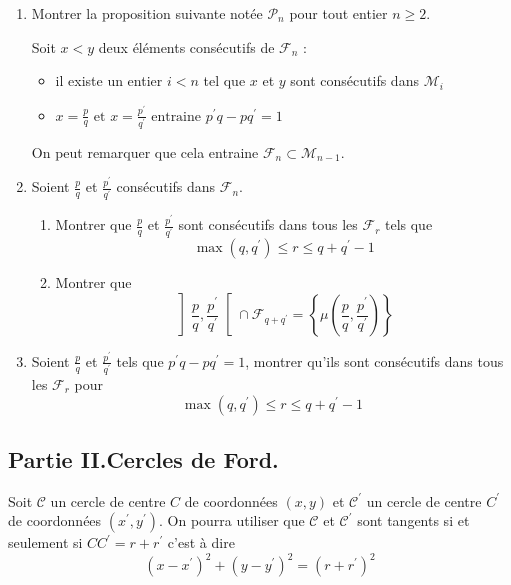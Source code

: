 \begin{enumerate}
\item  Montrer la proposition suivante notée $\mathcal{P}_{n}$ pour tout entier $n\geq 2$.

Soit $x<y$ deux éléments consécutifs de $\mathcal{F}_{n}$ :
\begin{itemize}
 \item il existe un entier $i<n$ tel que $x$ et $y$ sont consécutifs dans $\mathcal{M}_{i}$ 
 \item $x=\frac{p}{q} \text{ et } x=\frac{p^\prime}{q^\prime} \text{ entraine } p^{\prime }q-pq^{\prime }=1$
\end{itemize}
On peut remarquer que cela entraine $\mathcal F _n \subset \mathcal M_{n-1}$.

\item  Soient $\frac{p}{q}$ et $\frac{p^{\prime }}{q^{\prime }}$ cons{\'e}cutifs dans $\mathcal{F}_{n}.$

\begin{enumerate}
\item  Montrer que $\frac{p}{q}$ et $\frac{p^{\prime }}{q^{\prime }}$ sont
cons{\'e}cutifs dans tous les $\mathcal{F}_{r}$ tels que
\[
\max (q,q^{\prime })\leq r\leq q+q^{\prime }-1
\]

\item  Montrer que
\[
\left] \frac{p}{q},\frac{p^{\prime }}{q^{\prime }}\right[ \cap \mathcal{F}%
_{q+q^{\prime }}=\left\{ \mu (\frac{p}{q},\frac{p^{\prime }}{q^{\prime }}%
)\right\}
\]
\end{enumerate}

\item  Soient $\frac{p}{q}$ et $\frac{p^{\prime }}{q^{\prime }}$ tels que $p^{\prime }q-pq^{\prime }=1$, montrer qu'ils sont cons{\'e}cutifs dans tous les $\mathcal{F}_{r}$ pour
\[
\max (q,q^{\prime })\leq r\leq q+q^{\prime }-1
\]
\end{enumerate}

\subsection*{Partie II.\quad Cercles de Ford.}

Soit $\mathcal{C}$ un cercle de centre $C$ de coordonn{\'e}es $(x,y)$ et $\mathcal{C}^{\prime }$ un cercle de centre $C^{\prime }$ de coordonn{\'e}es $ (x^{\prime },y^{\prime })$. On pourra utiliser que $\mathcal{C}$ et $\mathcal{C}^{\prime }$ sont tangents si et seulement si $CC^{\prime}=r+r^{\prime }$ c'est {\`a} dire
\[
(x-x^{\prime })^{2}+(y-y^{\prime })^{2}=(r+r^{\prime })^{2}
\]

